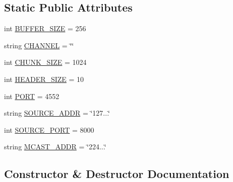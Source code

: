 \subsection*{Static Public Attributes}
\begin{DoxyCompactItemize}
\item 
int \hyperlink{classsrc_1_1core_1_1splitter__ims_1_1Splitter__IMS_a3f35cac2e4c7000607b2adb5192f7c54}{B\+U\+F\+F\+E\+R\+\_\+\+S\+I\+Z\+E} = 256
\item 
string \hyperlink{classsrc_1_1core_1_1splitter__ims_1_1Splitter__IMS_a78c9bd84c277ea57f2226f7947bf95b9}{C\+H\+A\+N\+N\+E\+L} = \char`\"{}\char`\"{}
\item 
int \hyperlink{classsrc_1_1core_1_1splitter__ims_1_1Splitter__IMS_a9c02e7d5908003aa9f377250f7308738}{C\+H\+U\+N\+K\+\_\+\+S\+I\+Z\+E} = 1024
\item 
int \hyperlink{classsrc_1_1core_1_1splitter__ims_1_1Splitter__IMS_ac609270a04a7e3313fcf01d23a817b01}{H\+E\+A\+D\+E\+R\+\_\+\+S\+I\+Z\+E} = 10
\item 
int \hyperlink{classsrc_1_1core_1_1splitter__ims_1_1Splitter__IMS_a3be7f8f0ead9a2ea2f50a5d199e90228}{P\+O\+R\+T} = 4552
\item 
string \hyperlink{classsrc_1_1core_1_1splitter__ims_1_1Splitter__IMS_acae4925426639a658770ec19b774448b}{S\+O\+U\+R\+C\+E\+\_\+\+A\+D\+D\+R} = \char`\"{}127...\char`\"{}
\item 
int \hyperlink{classsrc_1_1core_1_1splitter__ims_1_1Splitter__IMS_a82fc8d06d3d3bfe1bdec8c7293ddf92c}{S\+O\+U\+R\+C\+E\+\_\+\+P\+O\+R\+T} = 8000
\item 
string \hyperlink{classsrc_1_1core_1_1splitter__ims_1_1Splitter__IMS_acba6d7adaea78215ea4736431465da9e}{M\+C\+A\+S\+T\+\_\+\+A\+D\+D\+R} = \char`\"{}224...\char`\"{}
\end{DoxyCompactItemize}


\subsection{Constructor \& Destructor Documentation}
\hypertarget{classsrc_1_1core_1_1splitter__ims_1_1Splitter__IMS_a08e883da468a496050643ed4d3ebe7ec}{}
